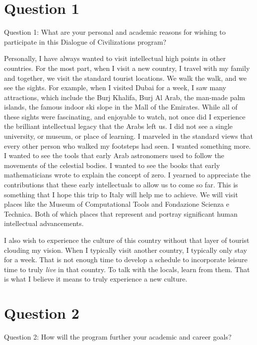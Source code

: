 \documentclass{article}
\begin{document}
 

\section{Question 1} Question 1: What are your personal and academic reasons for
wishing to participate in this Dialogue of Civilizations program?

Personally, I have always wanted to visit intellectual high points in other
countries. For the most part, when I visit a new country, I travel with my
family and together, we visit the standard tourist locations. We walk the walk,
and we see the sights. For example, when I visited Dubai for a week, I saw many
attractions, which include the Burj Khalifa, Burj Al Arab, the man-made palm
islands, the famous indoor ski slope in the Mall of the Emirates. While all of
these sights were fascinating, and enjoyable to watch, not once did I experience
the brilliant intellectual legacy that the Arabs left us. I did not see a single
university, or museum, or place of learning. I marveled in the standard views
that every other person who walked my footsteps had seen. I wanted something
more. I wanted to see the tools that early Arab astronomers used to follow the
movements of the celestial bodies. I wanted to see the books that early
mathematicians wrote to explain the concept of zero. I yearned to appreciate the
contributions that these early intellectuals to allow us to come so far. This is
something that I hope this trip to Italy will help me to achieve. We will visit
places like the Museum of Computational Tools and Fondazione Scienza e Technica.
Both of which places that represent and portray significant human intellectual
advancements.

I also wish to experience the culture of this country without that layer of
tourist clouding my vision. When I typically visit another country, I typically
only stay for a week. That is not enough time to develop a schedule to
incorporate leisure time to truly \textit{live} in that country. To talk with
the locals, learn from them. That is what I believe it means to truly experience
a new culture.

\section{Question 2} Question 2: How will the program further your academic and
career goals?
\end{document}
